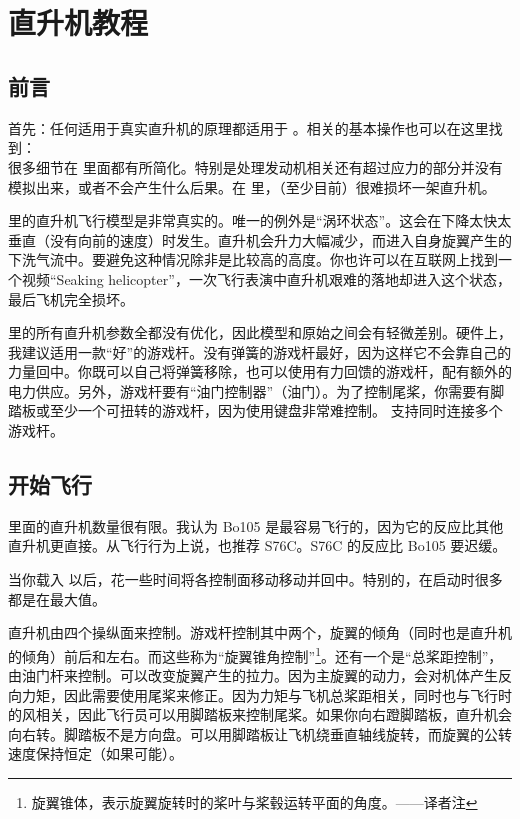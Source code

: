 \ifchinese
\chapter{{\\}直升机教程}
\label{helicopter}

\section{前言}

首先：任何适用于真实直升机的原理都适用于 \FlightGear。相关的基本操作也可以在这里找到：\\ 很多细节在 \FlightGear 里面都有所简化。特别是处理发动机相关还有超过应力的部分并没有模拟出来，或者不会产生什么后果。在 \FlightGear 里，（至少目前）很难损坏一架直升机。


\FlightGear 里的直升机飞行模型是非常真实的。唯一的例外是“涡环状态”。这会在下降太快太垂直（没有向前的速度）时发生。直升机会升力大幅减少，而进入自身旋翼产生的下洗气流中。要避免这种情况除非是比较高的高度。你也许可以在互联网上找到一个视频“Seaking helicopter”，一次飞行表演中直升机艰难的落地却进入这个状态，最后飞机完全损坏。

\FlightGear 里的所有直升机参数全都没有优化，因此模型和原始之间会有轻微差别。硬件上，我建议适用一款“好”的游戏杆。没有弹簧的游戏杆最好，因为这样它不会靠自己的力量回中。你既可以自己将弹簧移除，也可以使用有力回馈的游戏杆，配有额外的电力供应。另外，游戏杆要有“油门控制器”（油门）。为了控制尾桨，你需要有脚踏板或至少一个可扭转的游戏杆，因为使用键盘非常难控制。\FlightGear{} 支持同时连接多个游戏杆。

\section{开始飞行}

\FlightGear{} 里面的直升机数量很有限。我认为 Bo105 是最容易飞行的，因为它的反应比其他直升机更直接。从飞行行为上说，也推荐 S76C。S76C 的反应比 Bo105 要迟缓。

当你载入 \FlightGear 以后，花一些时间将各控制面移动移动并回中。特别的，在启动时很多都是在最大值。


直升机由四个操纵面来控制。游戏杆控制其中两个，旋翼的倾角（同时也是直升机的倾角）前后和左右。而这些称为“旋翼锥角控制”\footnote{旋翼锥体，表示旋翼旋转时的桨叶与桨毂运转平面的角度。——译者注}。还有一个是“总桨距控制”，由油门杆来控制。可以改变旋翼产生的拉力。因为主旋翼的动力，会对机体产生反向力矩，因此需要使用尾桨来修正。因为力矩与飞机总桨距相关，同时也与飞行时的风相关，因此飞行员可以用脚踏板来控制尾桨。如果你向右蹬脚踏板，直升机会向右转。脚踏板不是方向盘。可以用脚踏板让飞机绕垂直轴线旋转，而旋翼的公转速度保持恒定（如果可能）。

